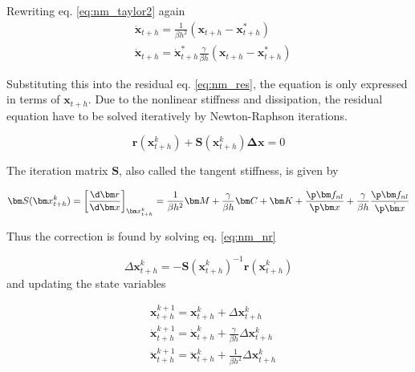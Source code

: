 Rewriting eq. \eqref{eq:nm_taylor2} again
\begin{equation}
  \label{eq:nm_scheme}
  \begin{aligned}
    &\ddot{\bm x}_{t+h} = \frac{1}{\beta h^2} (\bm x_{t+h} - \bm x^*_{t+h}) \\
    &\dot{\bm x}_{t+h} = \dot{\bm x}^*_{t+h} \frac{\gamma}{\beta h} (\bm x_{t+h} - \bm x^*_{t+h})
  \end{aligned}
\end{equation}

Substituting this into the residual eq. \eqref{eq:nm_res}, the equation is only
expressed in terms of $\bm x_{t+h}$. Due to the nonlinear stiffness and
dissipation, the residual equation have to be solved iteratively by Newton-Raphson
iterations.


\begin{equation}
  \label{eq:nm_nr}
  \bm r(\bm x^k_{t+h}) + \bm S(\bm x^k_{t+h}) \bm \Delta \bm x = 0
\end{equation}

The iteration matrix $\bm S$, also called the tangent stiffness, is given by

\begin{equation}
  \label{eq:nm_tangent}
  \bm S(\bm x^k_{t+h}) = \left[ \frac{\d \bm r}{\d \bm x} \right]_{\bm x^k_{t+h}} =
  \frac{1}{\beta h^2} \bm M + \frac{\gamma}{\beta h} \bm C + \bm K +
  \frac{\p \bm f_{nl}}{\p \bm x} +
  \frac{\gamma}{\beta h} \frac{\p \bm f_{nl}}{\p \dot{ \bm x}}
\end{equation}

Thus the correction is found by solving eq. \eqref{eq:nm_nr}

\begin{equation}
  \label{eq:nm_nr2}
  \Delta \bm x^k_{t+h} = - \bm S(\bm x^k_{t+h})^{-1} \bm r(\bm x^k_{t+h})
\end{equation}
and updating the state variables

\begin{equation}
  \begin{aligned}
    &\bm x^{k+1}_{t+h} = \bm x^k_{t+h} + \Delta \bm x^k_{t+h} \\
    &\dot{\bm x}^{k+1}_{t+h} = \dot{\bm x}^k_{t+h} +
    \frac{\gamma}{\beta h} \Delta \bm x^k_{t+h} \\
    &\ddot{\bm x}^{k+1}_{t+h} = \ddot{\bm x}^k_{t+h} +
    \frac{1}{\beta h^2} \Delta \bm x^k_{t+h} \\
  \end{aligned}
\end{equation}

